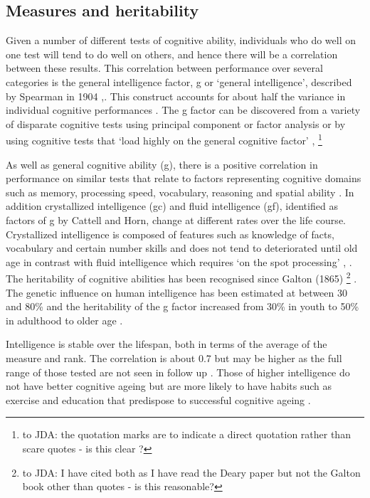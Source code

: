 \subsection{Measures and heritability}
\label{sec:intelligence measures and heritability}
Given a number of different tests of cognitive ability, individuals who do well on one test will tend to do well on others, and hence there will be a correlation between these results. This correlation between performance over several categories is the general intelligence factor, g or ‘general intelligence’, described by Spearman in 1904  \cite{deary2001intelligence}
,\cite{deary2014stability}. This construct accounts for about half the variance in individual cognitive performances \cite{deary2009genetic}.
 The g factor can be discovered from a variety of disparate cognitive tests using principal component or factor analysis or by using cognitive tests that ‘load highly on the general cognitive factor’ \cite{johnson2004just},
 \cite{deary2009genetic} 
 \footnote{to JDA: the quotation marks are to indicate a direct quotation rather than scare quotes - is this clear ?}

As well as general cognitive ability (g), there is a positive correlation in performance on similar tests that relate to factors representing cognitive domains such as memory, processing speed, vocabulary, reasoning and spatial ability \cite{deary2010cognitive}.
In addition crystallized intelligence (gc) and fluid intelligence (gf), identified as factors of g by Cattell and Horn, change at different rates over the life course. Crystallized intelligence is composed of features such as knowledge of facts, vocabulary and certain number skills and does not tend to deteriorated until old age in contrast with fluid intelligence which requires ‘on the spot processing’ \cite{deary2010cognitive},
\cite{davies2015genetic}.%
The heritability of cognitive abilities has been recognised since Galton (1865) \cite{deary2001human} \cite{galton1869hereditary} \footnote{to JDA: I have cited both as I have read the Deary paper but not the Galton book other than quotes - is this reasonable?}
. The genetic influence on human intelligence has been estimated at between 30 and 80\% and the heritability of the g factor increased from 30\% in youth to 50\% in adulthood to older age \cite{deary2009genetic}.


Intelligence is stable over the lifespan, both in terms of the average of the measure and rank. The correlation is about 0.7 but may be higher as the full range of those tested are not seen in follow up \cite{deary2009genetic}.
Those of higher intelligence do not have better cognitive ageing but are more likely to have habits such as exercise and education that predispose to successful cognitive ageing \cite{deary2014stability}.%

